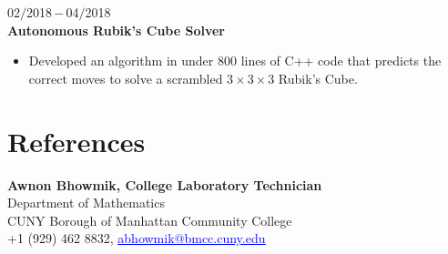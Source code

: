 \documentclass[a4paper, 12pt]{article}
\begin{document}
    \begin{flushleft}
    	02$/$2018\,$-$\,04$/$2018\\
    	\textbf{Autonomous Rubik's Cube Solver}
    	\begin{itemize}
    		\item Developed an algorithm in under $800$ lines of C++ code that predicts the correct moves to solve
a scrambled $3\times3\times3$ Rubik's Cube.
    	\end{itemize}
    \end{flushleft}
    
    \section*{References}
    \begin{flushleft}
    \textbf{Awnon Bhowmik, College Laboratory Technician}\\
    Department of Mathematics\\
    CUNY Borough of Manhattan Community College\\
    +1 (929) 462 8832, \href{abhowmik@bmcc.cuny.edu}{\textcolor{blue}{\underline{abhowmik@bmcc.cuny.edu}}}
    \end{flushleft}
\end{document}
